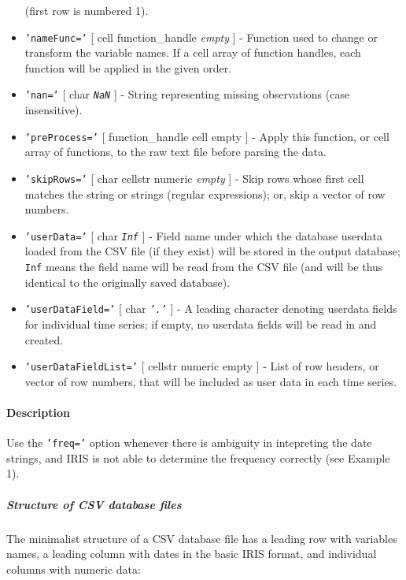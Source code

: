 \begin{itemize}
  (first row is numbered 1).
\item
  \texttt{'nameFunc='} {[} cell \textbar{} function\_handle \textbar{}
  \emph{empty} {]} - Function used to change or transform the variable
  names. If a cell array of function handles, each function will be
  applied in the given order.
\item
  \texttt{'nan='} {[} char \textbar{} \emph{\texttt{NaN}} {]} - String
  representing missing observations (case insensitive).
\item
  \texttt{'preProcess='} {[} function\_handle \textbar{} cell \textbar{}
  empty {]} - Apply this function, or cell array of functions, to the
  raw text file before parsing the data.
\item
  \texttt{'skipRows='} {[} char \textbar{} cellstr \textbar{} numeric
  \textbar{} \emph{empty} {]} - Skip rows whose first cell matches the
  string or strings (regular expressions); or, skip a vector of row
  numbers.
\item
  \texttt{'userData='} {[} char \textbar{} \emph{\texttt{Inf}} {]} -
  Field name under which the database userdata loaded from the CSV file
  (if they exist) will be stored in the output database; \texttt{Inf}
  means the field name will be read from the CSV file (and will be thus
  identical to the originally saved database).
\item
  \texttt{'userDataField='} {[} char \textbar{} \emph{\texttt{'.'}} {]}
  - A leading character denoting userdata fields for individual time
  series; if empty, no userdata fields will be read in and created.
\item
  \texttt{'userDataFieldList='} {[} cellstr \textbar{} numeric
  \textbar{} empty {]} - List of row headers, or vector of row numbers,
  that will be included as user data in each time series.
\end{itemize}

\paragraph{Description}\label{description}

Use the \texttt{'freq='} option whenever there is ambiguity in
intepreting the date strings, and IRIS is not able to determine the
frequency correctly (see Example 1).

\subparagraph{Structure of CSV database
files}\label{structure-of-csv-database-files}

The minimalist structure of a CSV database file has a leading row with
variables names, a leading column with dates in the basic IRIS format,
and individual columns with numeric data:

